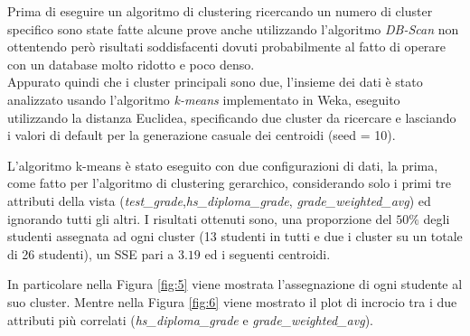 \documentclass[]{article}
\begin{document}
Prima di eseguire un algoritmo di clustering ricercando un numero di cluster specifico sono state fatte alcune prove anche utilizzando l'algoritmo \textit{DB-Scan} non ottentendo per\`{o} risultati soddisfacenti dovuti probabilmente al fatto di operare con un database molto ridotto e poco denso.\\

Appurato quindi che i cluster principali sono due, l'insieme dei dati \`{e} stato analizzato usando l'algoritmo \textit{k-means} implementato in Weka, eseguito utilizzando la distanza Euclidea, specificando due cluster da ricercare e lasciando i valori di default per la generazione casuale dei centroidi (seed = 10).

L'algoritmo k-means \`{e} stato eseguito con due configurazioni di dati, la prima, come fatto per l'algoritmo di clustering gerarchico, considerando solo i primi tre attributi della vista (\textit{test\_grade},\textit{hs\_diploma\_grade}, \textit{grade\_weighted\_avg}) ed ignorando tutti gli altri. I risultati ottenuti sono, una proporzione del $50\%$ degli studenti assegnata ad ogni cluster (13 studenti in tutti e due i cluster su un totale di 26 studenti), un SSE pari a $3.19$ ed i seguenti centroidi.

\begin{center}
\end{center}

In particolare nella Figura \ref{fig:5} viene mostrata l'assegnazione di ogni studente al suo cluster. Mentre nella Figura \ref{fig:6} viene mostrato il plot di incrocio tra i due attributi pi\`{u} correlati (\textit{hs\_diploma\_grade} e \textit{grade\_weighted\_avg}).
\end{document}
